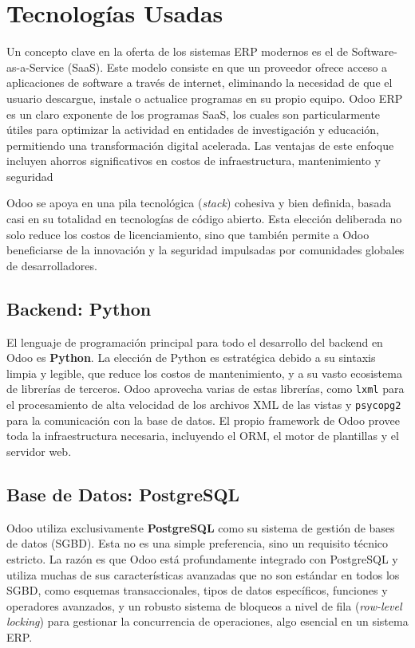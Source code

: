 \documentclass[12pt,letterpaper,spanish]{report}
\begin{document}
\section{Tecnologías Usadas}
\label{sec:tecnologias_usadas}
Un concepto clave en la oferta de los sistemas ERP modernos es el de Software-as-a-Service (SaaS). Este modelo consiste en que un proveedor ofrece acceso a aplicaciones de software a través de internet, eliminando la necesidad de que el usuario descargue, instale o actualice programas en su propio equipo. Odoo ERP es un claro exponente de los programas SaaS, los cuales son particularmente útiles para optimizar la actividad en entidades de investigación y educación, permitiendo una transformación digital acelerada. Las ventajas de este enfoque incluyen ahorros significativos en costos de infraestructura, mantenimiento y seguridad

Odoo se apoya en una pila tecnológica (\textit{stack}) cohesiva y bien definida, basada casi en su totalidad en tecnologías de código abierto. Esta elección deliberada no solo reduce los costos de licenciamiento, sino que también permite a Odoo beneficiarse de la innovación y la seguridad impulsadas por comunidades globales de desarrolladores.

\subsection{Backend: Python}
El lenguaje de programación principal para todo el desarrollo del backend en Odoo es \textbf{Python}. La elección de Python es estratégica debido a su sintaxis limpia y legible, que reduce los costos de mantenimiento, y a su vasto ecosistema de librerías de terceros. Odoo aprovecha varias de estas librerías, como \texttt{lxml} para el procesamiento de alta velocidad de los archivos XML de las vistas y \texttt{psycopg2} para la comunicación con la base de datos. El propio framework de Odoo provee toda la infraestructura necesaria, incluyendo el ORM, el motor de plantillas y el servidor web.

\subsection{Base de Datos: PostgreSQL}
Odoo utiliza exclusivamente \textbf{PostgreSQL} como su sistema de gestión de bases de datos (SGBD). Esta no es una simple preferencia, sino un requisito técnico estricto. La razón es que Odoo está profundamente integrado con PostgreSQL y utiliza muchas de sus características avanzadas que no son estándar en todos los SGBD, como esquemas transaccionales, tipos de datos específicos, funciones y operadores avanzados, y un robusto sistema de bloqueos a nivel de fila (\textit{row-level locking}) para gestionar la concurrencia de operaciones, algo esencial en un sistema ERP.
\end{document}
